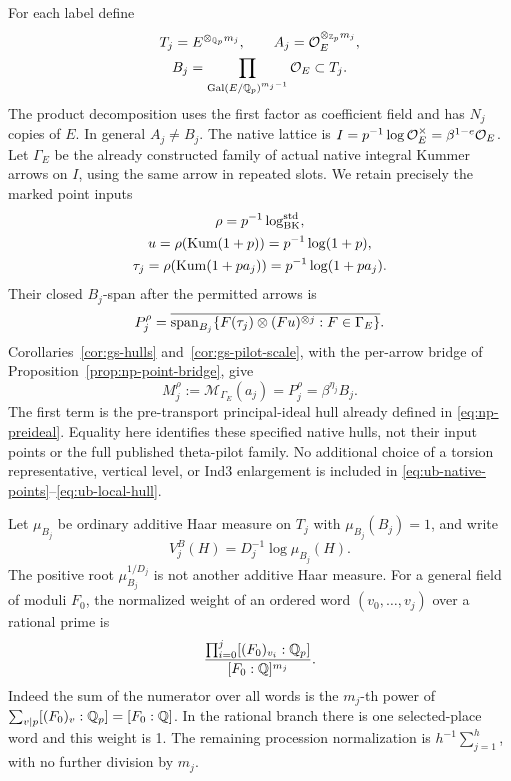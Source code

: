 For each label define
\[
 \begin{gathered}
 T_j=E^{\otimes_{\mathbb Q_p}m_j},\qquad
 A_j=\mathcal O_E^{\otimes_{\mathbb Z_p}m_j},\\
 B_j=\prod_{\operatorname{Gal}(E/\mathbb Q_p)^{m_j-1}}\mathcal O_E
       \subset T_j.
 \end{gathered}
\]
The product decomposition uses the first factor as coefficient
field and has $N_j$ copies of $E$. In general $A_j\ne B_j$.
The native lattice is
$I=p^{-1}\log\mathcal O_E^\times=\beta^{1-e}\mathcal O_E$.
Let $\Gamma_E$ be the already constructed family of actual native
integral Kummer arrows on $I$, using the same arrow in repeated slots.
We retain precisely the marked point inputs
\begin{equation}\label{eq:ub-native-points}
 \begin{gathered}
 \rho=p^{-1}\log_{\rm BK}^{\rm std},\\
 u=\rho({\rm Kum}(1+p))=p^{-1}\log(1+p),\\
 \tau_j=\rho({\rm Kum}(1+pa_j))=p^{-1}\log(1+pa_j).
 \end{gathered}
\end{equation}
Their closed $B_j$-span after the permitted arrows is
\[
 P_j^\rho=
 \overline{\operatorname{span}_{B_j}
   \{F(\tau_j)\otimes(Fu)^{\otimes j}:F\in\Gamma_E\}}.
\]
Corollaries~\ref{cor:gs-hulls} and~\ref{cor:gs-pilot-scale}, with the
per-arrow bridge of Proposition~\ref{prop:np-point-bridge}, give
\begin{equation}\label{eq:ub-local-hull}
 M_j^\rho:=\mathcal M_{\Gamma_E}(a_j)
       =P_j^\rho=\beta^{\eta_j}B_j.
\end{equation}
The first term is the pre-transport principal-ideal hull already
defined in \eqref{eq:np-preideal}. Equality here identifies these
specified native hulls, not their input points or the full published
theta-pilot family. No additional choice of a torsion representative,
vertical level, or Ind3 enlargement is included in
\eqref{eq:ub-native-points}--\eqref{eq:ub-local-hull}.

Let $\mu_{B_j}$ be ordinary additive Haar measure on $T_j$ with
$\mu_{B_j}(B_j)=1$, and write
\begin{equation}\label{eq:ub-local-volume}
 V_j^B(H)=D_j^{-1}\log\mu_{B_j}(H).
\end{equation}
The positive root $\mu_{B_j}^{1/D_j}$ is not another additive Haar
measure. For a general field of moduli $F_0$, the normalized weight
of an ordered word $(v_0,\ldots,v_j)$ over a rational prime is
\[
 \frac{\prod_{i=0}^j[(F_0)_{v_i}:\mathbb Q_p]}
      {[F_0:\mathbb Q]^{m_j}}.
\]
Indeed the sum of the numerator over all words is the $m_j$-th power
of $\sum_{v\mid p}[(F_0)_v:\mathbb Q_p]=[F_0:\mathbb Q]$. In the rational branch
there is one selected-place word and this weight is 1. The remaining
procession normalization is $h^{-1}\sum_{j=1}^h$, with no further
division by $m_j$.

